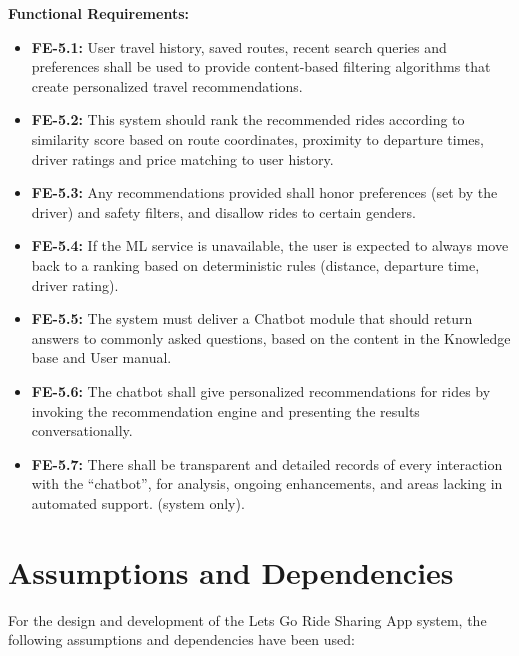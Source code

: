 \textbf{Functional Requirements:}

\begin{itemize}
    \item \textbf{FE-5.1:} User travel history, saved routes, recent search queries and preferences shall be used to provide content-based filtering algorithms that create personalized travel recommendations.

    \item \textbf{FE-5.2:} This system should rank the recommended rides according to similarity score based on route coordinates, proximity to departure times, driver ratings and price matching to user history.

    \item \textbf{FE-5.3:} Any recommendations provided shall honor preferences (set by the driver) and safety filters, and disallow rides to certain genders.

    \item \textbf{FE-5.4:} If the ML service is unavailable, the user is expected to always move back to a ranking based on deterministic rules (distance, departure time, driver rating).

    \item \textbf{FE-5.5:} The system must deliver a Chatbot module that should return answers to commonly asked questions, based on the content in the Knowledge base and User manual.

    \item \textbf{FE-5.6:} The chatbot shall give personalized recommendations for rides by invoking the recommendation engine and presenting the results conversationally.

    \item \textbf{FE-5.7:} There shall be transparent and detailed records of every interaction with the “chatbot”, for analysis, ongoing enhancements, and areas lacking in automated support. (system only).
\end{itemize}


\section{Assumptions and Dependencies}

For the design and development of the Lets Go Ride Sharing App system, the following assumptions and dependencies have been used:

